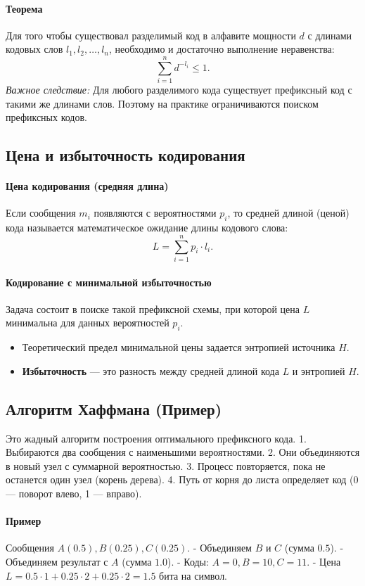 \paragraph{Теорема}
Для того чтобы существовал разделимый код в алфавите мощности $d$ с длинами кодовых слов $l_1, l_2, \dots, l_n$, необходимо и достаточно выполнение неравенства:
$$\sum_{i=1}^n d^{-l_i} \le 1.$$
\textit{Важное следствие:} Для любого разделимого кода существует префиксный код с такими же длинами слов. Поэтому на практике ограничиваются поиском префиксных кодов.

\subsection*{Цена и избыточность кодирования}

\paragraph{Цена кодирования (средняя длина)}
Если сообщения $m_i$ появляются с вероятностями $p_i$, то средней длиной (ценой) кода называется математическое ожидание длины кодового слова:
$$L = \sum_{i=1}^n p_i \cdot l_i.$$

\paragraph{Кодирование с минимальной избыточностью}
Задача состоит в поиске такой префиксной схемы, при которой цена $L$ минимальна для данных вероятностей $p_i$.
\begin{itemize}
    \item Теоретический предел минимальной цены задается энтропией источника $H$.
    \item \textbf{Избыточность} — это разность между средней длиной кода $L$ и энтропией $H$.
\end{itemize}

\subsection*{Алгоритм Хаффмана (Пример)}
Это жадный алгоритм построения оптимального префиксного кода.
1. Выбираются два сообщения с наименьшими вероятностями.
2. Они объединяются в новый узел с суммарной вероятностью.
3. Процесс повторяется, пока не останется один узел (корень дерева).
4. Путь от корня до листа определяет код (0 — поворот влево, 1 — вправо).

\paragraph{Пример}
Сообщения $A(0.5), B(0.25), C(0.25)$.
- Объединяем $B$ и $C$ (сумма $0.5$).
- Объединяем результат с $A$ (сумма $1.0$).
- Коды: $A=0, B=10, C=11$.
- Цена $L = 0.5\cdot 1 + 0.25\cdot 2 + 0.25\cdot 2 = 1.5$ бита на символ.